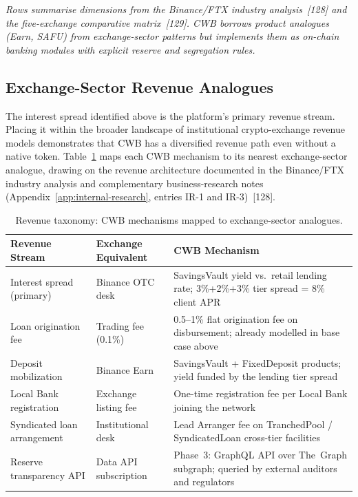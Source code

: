 \documentclass[12pt,a4paper]{report}
\newcommand{\tableheadcolor}{\rowcolor{TableHeadBg}}
\begin{document}
\vspace{2pt}
\noindent\textit{\small Rows summarise dimensions from the Binance/FTX industry analysis~[128] and the five-exchange comparative matrix~[129]. CWB borrows \textit{product analogues} (Earn, SAFU) from exchange-sector patterns but implements them as on-chain banking modules with explicit reserve and segregation rules.}

\subsection{Exchange-Sector Revenue Analogues}
\label{sec:revenue-analogues}

\noindent The interest spread identified above is the platform's primary revenue stream. Placing it within the broader landscape of institutional crypto-exchange revenue models demonstrates that CWB has a diversified revenue path even without a native token. Table~\ref{tab:revenue-taxonomy} maps each CWB mechanism to its nearest exchange-sector analogue, drawing on the revenue architecture documented in the Binance/FTX industry analysis and complementary business-research notes (Appendix~\ref{app:internal-research}, entries IR-1 and IR-3)~[128].

\begin{table}[H]
\centering
\caption[Revenue taxonomy vs.\ exchange analogues]{Revenue taxonomy: CWB mechanisms mapped to exchange-sector analogues.}
\label{tab:revenue-taxonomy}
\begin{tabular}{p{3.8cm}p{3.8cm}p{5.6cm}}
\toprule
\tableheadcolor
\textbf{Revenue Stream} & \textbf{Exchange Equivalent} & \textbf{CWB Mechanism} \\
\midrule
Interest spread (primary) & Binance OTC desk & SavingsVault yield vs.\ retail lending rate; 3\%+2\%+3\% tier spread = 8\% client APR \\
Loan origination fee & Trading fee (0.1\%) & 0.5--1\% flat origination fee on disbursement; already modelled in base case above \\
Deposit mobilization & Binance Earn & SavingsVault + FixedDeposit products; yield funded by the lending tier spread \\
Local Bank registration & Exchange listing fee & One-time registration fee per Local Bank joining the network \\
Syndicated loan arrangement & Institutional desk & Lead Arranger fee on TranchedPool / SyndicatedLoan cross-tier facilities \\
Reserve transparency API & Data API subscription & Phase~3: GraphQL API over The~Graph subgraph; queried by external auditors and regulators \\
\bottomrule
\end{tabular}
\end{table}
\end{document}
